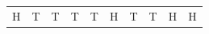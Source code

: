 {\begin{center}
\begin{xtabular*}{\mytablewidth}[t]{|p{10\mystarwidth}|p{10\mystarwidth}|p{10\mystarwidth}|p{10\mystarwidth}|p{10\mystarwidth}|p{10\mystarwidth}|p{10\mystarwidth}|p{10\mystarwidth}|p{10\mystarwidth}|p{10\mystarwidth}|}
    
        H &
    
    
        T &
    
    
        T &
    
    
        T &
    
    
        T &
    
    
        H &
    
    
        T &
    
    
        T &
    
    
        H &
    
    
        H%
     \tabularnewline{}
    

\end{xtabular*}
\end{center}}
